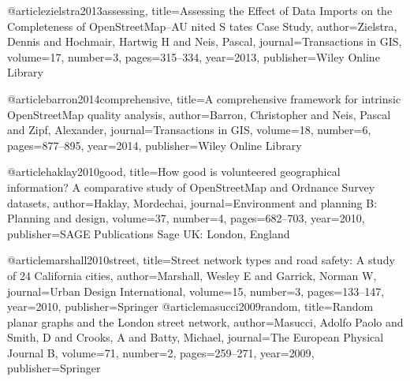 @article{zielstra2013assessing,
  title={Assessing the Effect of Data Imports on the Completeness of OpenStreetMap--AU nited S tates Case Study},
  author={Zielstra, Dennis and Hochmair, Hartwig H and Neis, Pascal},
  journal={Transactions in GIS},
  volume={17},
  number={3},
  pages={315--334},
  year={2013},
  publisher={Wiley Online Library}
}

@article{barron2014comprehensive,
  title={A comprehensive framework for intrinsic OpenStreetMap quality analysis},
  author={Barron, Christopher and Neis, Pascal and Zipf, Alexander},
  journal={Transactions in GIS},
  volume={18},
  number={6},
  pages={877--895},
  year={2014},
  publisher={Wiley Online Library}
}

@article{haklay2010good,
  title={How good is volunteered geographical information? A comparative study of OpenStreetMap and Ordnance Survey datasets},
  author={Haklay, Mordechai},
  journal={Environment and planning B: Planning and design},
  volume={37},
  number={4},
  pages={682--703},
  year={2010},
  publisher={SAGE Publications Sage UK: London, England}
}



@article{marshall2010street,
  title={Street network types and road safety: A study of 24 California cities},
  author={Marshall, Wesley E and Garrick, Norman W},
  journal={Urban Design International},
  volume={15},
  number={3},
  pages={133--147},
  year={2010},
  publisher={Springer}
}
@article{masucci2009random,
  title={Random planar graphs and the London street network},
  author={Masucci, Adolfo Paolo and Smith, D and Crooks, A and Batty, Michael},
  journal={The European Physical Journal B},
  volume={71},
  number={2},
  pages={259--271},
  year={2009},
  publisher={Springer}
}


